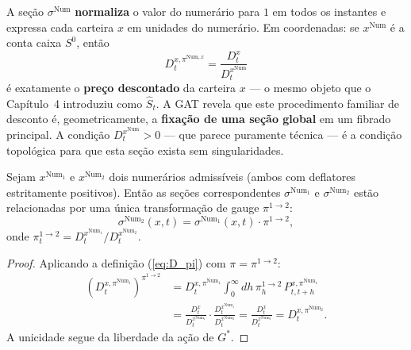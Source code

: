 \begin{obs}
A se\c{c}\~ao $\sigma^{\text{Num}}$ \textbf{normaliza} o valor do numer\'ario
para $1$ em todos os instantes e expressa cada carteira $x$ em unidades do
numer\'ario. Em coordenadas: se $x^{\text{Num}}$ \'e a conta caixa $S^0$,
ent\~ao
\begin{equation}
 D_t^{x, \pi^{\text{Num},x}} = \frac{D_t^x}{D_t^{x^{\text{Num}}}}
\end{equation}
\'e exatamente o \textbf{pre\c{c}o descontado} da carteira $x$ --- o mesmo
objeto que o Cap\'itulo~4 introduziu como $\hat{S}_t$. A GAT revela que este
procedimento familiar de desconto \'e, geometricamente, a \textbf{fixa\c{c}\~ao
de uma se\c{c}\~ao global} em um fibrado principal. A condi\c{c}\~ao
$D_t^{x^{\text{Num}}} > 0$ --- que parece puramente t\'ecnica --- \'e a
condi\c{c}\~ao topol\'ogica para que esta se\c{c}\~ao exista sem
singularidades.
\end{obs}

\begin{teo}[Mudan\c{c}a de Numer\'ario = Transforma\c{c}\~ao de Gauge]\label{teo:num_gauge}
Sejam $x^{\text{Num}_1}$ e $x^{\text{Num}_2}$ dois numer\'arios admiss\'iveis
(ambos com deflatores estritamente positivos). Ent\~ao as se\c{c}\~oes
correspondentes $\sigma^{\text{Num}_1}$ e $\sigma^{\text{Num}_2}$ est\~ao
relacionadas por uma \'unica transforma\c{c}\~ao de gauge $\pi^{1 \to 2}$:
\begin{equation}\label{eq:num_gauge}
 \sigma^{\text{Num}_2}(x, t) = \sigma^{\text{Num}_1}(x, t)
 \cdot \pi^{1 \to 2},
\end{equation}
onde $\pi^{1 \to 2}_t = D_t^{x^{\text{Num}_1}} / D_t^{x^{\text{Num}_2}}$.
\end{teo}
\begin{proof}
Aplicando a defini\c{c}\~ao (\ref{eq:D_pi}) com $\pi = \pi^{1 \to 2}$:
\begin{align}
 (D_t^{x, \pi^{\text{Num}_1}})^{\pi^{1 \to 2}}
 &= D_t^{x, \pi^{\text{Num}_1}} \int_0^\infty dh \,
 \pi^{1 \to 2}_h \, P_{t, t+h}^{x, \pi^{\text{Num}_1}} \\
 &= \frac{D_t^x}{D_t^{x^{\text{Num}_1}}} \cdot
 \frac{D_t^{x^{\text{Num}_1}}}{D_t^{x^{\text{Num}_2}}}
 = \frac{D_t^x}{D_t^{x^{\text{Num}_2}}}
 = D_t^{x, \pi^{\text{Num}_2}}.
\end{align}
A unicidade segue da liberdade da a\c{c}\~ao de $G^*$.
\end{proof}

